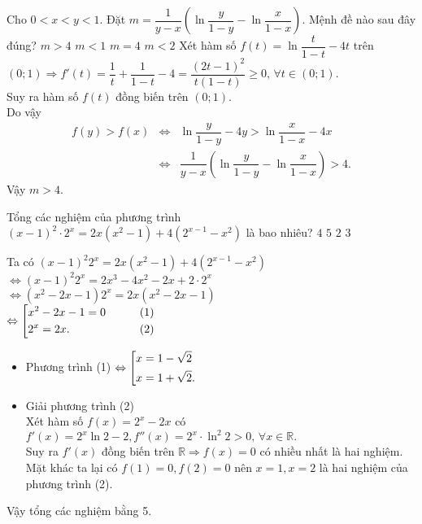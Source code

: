 \begin{ex}%
 Cho $ 0 < x < y < 1. $ Đặt $ m = \dfrac{1}{y-x} \left(\ln \dfrac{y}{1-y} - \ln \dfrac{x}{1-x}\right) $. Mệnh đề nào sau đây đúng?
\choice
{\True  $m>4$}
{$m<1 $}
{$m = 4$}
{$m < 2$}
	\loigiai
	{Xét hàm số $ f(t) = \ln \dfrac{t}{1-t} - 4t $ trên $ (0;1) \Rightarrow f'(t) = \dfrac{1}{t} + \dfrac{1}{1-t} - 4 = \dfrac{(2t-1)^2}{t(1-t)} \ge 0, \, \forall t \in (0;1)$.\\
		Suy ra hàm số $ f(t) $ đồng biến trên $ (0;1) $.\\
		Do vậy 
		\begin{eqnarray*}
		f(y) > f(x) &\Leftrightarrow&	 \ln \dfrac{y}{1-y} - 4y > \ln \dfrac{x}{1-x} - 4x\\
		&\Leftrightarrow& \dfrac{1}{y-x} \left(\ln \dfrac{y}{1-y} - \ln \dfrac{x}{1-x}\right) > 4.
		\end{eqnarray*}
		Vậy $ m > 4. $
	}
\end{ex}
\begin{ex}%
 Tổng các nghiệm của phương trình $ (x-1)^2 \cdot 2^x = 2x(x^2 -1) + 4(2^{x-1} - x^2)  $ là bao nhiêu?
\choice
{$4$}
{\True $5$}
{$2$}
{$3$}
	\loigiai
{Ta có $ (x-1)^2 2^x = 2x (x^2-1)+4\left(2^{x-1} - x^2\right) $\\
	$ \Leftrightarrow (x-1)^2 2^x = 2x^3 - 4x^2 - 2x + 2 \cdot 2^x $\\
	$ \Leftrightarrow (x^2 - 2x - 1)2^x = 2x (x^2 - 2x - 1)  $\\
	$ \Leftrightarrow \left[\begin{aligned}&x^2 - 2x - 1 = 0 \quad\quad &(1)\\ & 2^x = 2x. \quad\quad &(2)\end{aligned}\right. $
	\begin{itemize}
		\item Phương trình (1) $ \Leftrightarrow \left[\begin{aligned}& x = 1 - \sqrt{2} \\ & x = 1 + \sqrt{2}.\end{aligned}\right. $
		\item Giải phương trình (2)\\
		Xét hàm số $ f(x) = 2^x - 2x $ có $ f'(x) = 2^x \ln 2 - 2, f''(x) = 2^x \cdot \ln^2 2 > 0, \, \forall x \in \mathbb{R}. $\\
		Suy ra $ f'(x) $ đồng biến trên $ \mathbb{R} \Rightarrow f(x) = 0$ có nhiều nhất là hai nghiệm.\\
		Mặt khác ta lại có $ f(1) = 0, f(2) = 0 $ nên $ x =1, x = 2 $ là hai nghiệm của phương trình (2).
	\end{itemize}
Vậy tổng các nghiệm bằng 5.
}	
\end{ex}
